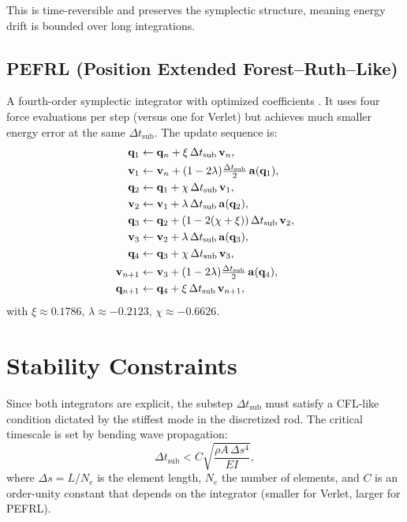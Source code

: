 \documentclass[11pt]{article}
\newcommand{\vect}[1]{\mathbf{#1}}
\newcommand{\dtsub}{\Delta t_{\mathrm{sub}}}
\begin{document}
\noindent This is time-reversible and preserves the symplectic structure,
meaning energy drift is bounded over long integrations.

\subsection{PEFRL (Position Extended Forest--Ruth--Like)}
\label{sec:pefrl}

A fourth-order symplectic integrator with optimized coefficients
\cite{omelyan2002optimized}.  It uses four force evaluations per step
(versus one for Verlet) but achieves much smaller energy error at the
same $\dtsub$.  The update sequence is:
\begin{align}
  \vect{q}_1 &\gets \vect{q}_n + \xi\,\dtsub\,\vect{v}_n, \notag \\
  \vect{v}_1 &\gets \vect{v}_n + (1-2\lambda)\tfrac{\dtsub}{2}\,\vect{a}(\vect{q}_1), \notag \\
  \vect{q}_2 &\gets \vect{q}_1 + \chi\,\dtsub\,\vect{v}_1, \notag \\
  \vect{v}_2 &\gets \vect{v}_1 + \lambda\,\dtsub\,\vect{a}(\vect{q}_2), \notag \\
  \vect{q}_3 &\gets \vect{q}_2 + (1-2(\chi+\xi))\,\dtsub\,\vect{v}_2, \notag \\
  \vect{v}_3 &\gets \vect{v}_2 + \lambda\,\dtsub\,\vect{a}(\vect{q}_3), \notag \\
  \vect{q}_4 &\gets \vect{q}_3 + \chi\,\dtsub\,\vect{v}_3, \notag \\
  \vect{v}_{n+1} &\gets \vect{v}_3 + (1-2\lambda)\tfrac{\dtsub}{2}\,\vect{a}(\vect{q}_4), \notag \\
  \vect{q}_{n+1} &\gets \vect{q}_4 + \xi\,\dtsub\,\vect{v}_{n+1},
  \label{eq:pefrl}
\end{align}
with $\xi \approx 0.1786$, $\lambda \approx -0.2123$, $\chi \approx -0.6626$.

\section{Stability Constraints}
\label{sec:stability}

Since both integrators are explicit, the substep $\dtsub$ must satisfy
a CFL-like condition dictated by the stiffest mode in the discretized rod.
The critical timescale is set by bending wave propagation:
\begin{equation}
  \dtsub < C \sqrt{\frac{\rho A \, \Delta s^4}{E I}},
  \label{eq:cfl}
\end{equation}
where $\Delta s = L / N_e$ is the element length, $N_e$ the number of
elements, and $C$ is an order-unity constant that depends on the
integrator (smaller for Verlet, larger for PEFRL).
\end{document}
